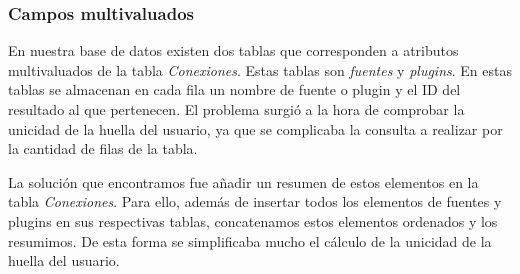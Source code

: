 \subsubsection{Campos multivaluados}
En nuestra base de datos existen dos tablas que corresponden a atributos multivaluados de la tabla \textit{Conexiones}. Estas tablas son \textit{fuentes} y \textit{plugins}. En estas tablas se almacenan en cada fila un nombre de fuente o plugin y el ID del resultado al que pertenecen. El problema surgió a la hora de comprobar la unicidad de la huella del usuario, ya que se complicaba la consulta a realizar por la cantidad de filas de la tabla.\par
La solución que encontramos fue añadir un resumen de estos elementos en la tabla \textit{Conexiones}. Para ello, además de insertar todos los elementos de fuentes y plugins en sus respectivas tablas, concatenamos estos elementos ordenados y los resumimos. De esta forma se simplificaba mucho el cálculo de la unicidad de la huella del usuario.